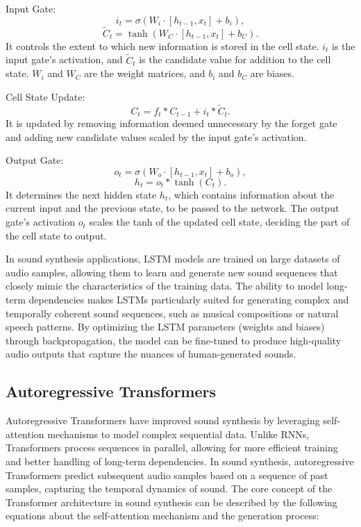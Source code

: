 \documentclass[11pt,a4paper,oneside]{report}
\begin{document}
Input Gate:
\begin{equation}
i_t = \sigma(W_{i} \cdot [h_{t-1}, x_t] + b_i),
\end{equation}
\begin{equation}
\tilde{C}_t = \tanh(W_{C} \cdot [h_{t-1}, x_t] + b_C).
\end{equation}
It controls the extent to which new information is stored in the cell state. $i_t$ is the input gate's activation, and $\tilde{C}_t$ is the candidate value for addition to the cell state. $W_{i}$ and $W_{C}$ are the weight matrices, and $b_i$ and $b_C$ are biases.

Cell State Update:
\begin{equation}
C_t = f_t \ast C_{t-1} + i_t \ast \tilde{C}_t.
\end{equation}
It is updated by removing information deemed unnecessary by the forget gate and adding new candidate values scaled by the input gate's activation.

Output Gate:
\begin{equation}
o_t = \sigma(W_{o} \cdot [h_{t-1}, x_t] + b_o),
\end{equation}
\begin{equation}
h_t = o_t \ast \tanh(C_t).
\end{equation}
It determines the next hidden state $h_t$, which contains information about the current input and the previous state, to be passed to the network. The output gate's activation $o_t$ scales the tanh of the updated cell state, deciding the part of the cell state to output.

In sound synthesis applications, LSTM models are trained on large datasets of audio samples, allowing them to learn and generate new sound sequences that closely mimic the characteristics of the training data. The ability to model long-term dependencies makes LSTMs particularly suited for generating complex and temporally coherent sound sequences, such as musical compositions or natural speech patterns. By optimizing the LSTM parameters (weights and biases) through backpropagation, the model can be fine-tuned to produce high-quality audio outputs that capture the nuances of human-generated sounds.

\subsection{Autoregressive Transformers}

Autoregressive Transformers \cite{yan2021videogpt, wu2022nuwa} have improved sound synthesis by leveraging self-attention mechanisms to model complex sequential data. Unlike RNNs, Transformers process sequences in parallel, allowing for more efficient training and better handling of long-term dependencies. 
In sound synthesis, autoregressive Transformers predict subsequent audio samples based on a sequence of past samples, capturing the temporal dynamics of sound.
The core concept of the Transformer architecture in sound synthesis can be described by the following equations about the self-attention mechanism and the generation process:
\end{document}
